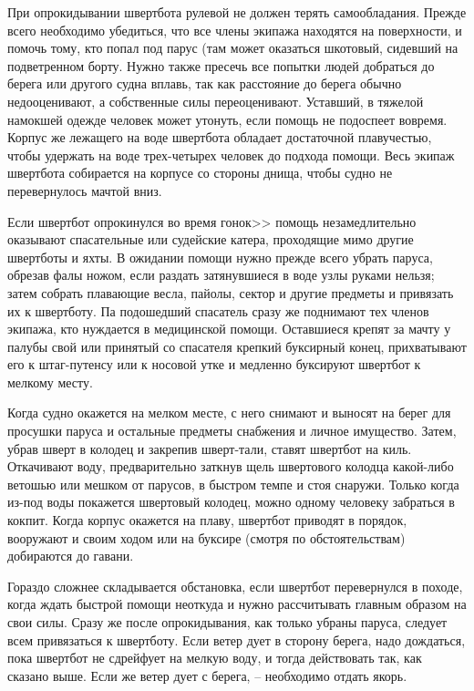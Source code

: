 \documentclass[a4paper, 12pt, twoside, final]{scrbook}
\begin{document}
При опрокидывании швертбота рулевой не должен терять самообладания. Прежде всего необходимо убедиться, что все члены экипажа находятся на поверхности, и помочь тому, кто попал под парус (там может оказаться шкотовый, сидевший на подветренном борту. Нужно также пресечь все попытки людей добраться до берега или другого судна вплавь, так как расстояние до берега обычно недооценивают, а собственные силы переоценивают. Уставший, в тяжелой намокшей одежде человек может утонуть, если помощь не подоспеет вовремя. Корпус же лежащего на воде швертбота обладает достаточной плавучестью, чтобы удержать на воде трех-четырех человек до подхода помощи. Весь экипаж швертбота собирается на корпусе со стороны днища, чтобы судно не перевернулось мачтой вниз.

Если швертбот опрокинулся во время гонок>> помощь незамедлительно оказывают спасательные или судейские катера, проходящие мимо другие швертботы и яхты. В ожидании помощи нужно прежде всего убрать паруса, обрезав фалы ножом, если раздать затянувшиеся в воде узлы руками нельзя; затем собрать плавающие весла, пайолы, сектор и другие предметы и привязать их к швертботу. Па подошедший спасатель сразу же поднимают тех членов экипажа, кто нуждается в медицинской помощи. Оставшиеся крепят за мачту у палубы свой или принятый со спасателя крепкий буксирный конец, прихватывают его к штаг-путенсу или к носовой утке и медленно буксируют швертбот к мелкому месту.

Когда судно окажется на мелком месте, с него снимают и выносят на берег для просушки паруса и остальные предметы снабжения и личное имущество. Затем, убрав шверт в колодец и закрепив шверт-тали, ставят швертбот на киль. Откачивают воду, предварительно заткнув щель швертового колодца какой-либо ветошью или мешком от парусов, в быстром темпе и стоя снаружи. Только когда из-под воды покажется швертовый колодец, можно одному человеку забраться в кокпит. Когда корпус окажется на плаву, швертбот приводят в порядок, вооружают и своим ходом или на буксире (смотря по обстоятельствам) добираются до гавани.

Гораздо сложнее складывается обстановка, если швертбот перевернулся в походе, когда ждать быстрой помощи неоткуда и нужно рассчитывать главным образом на свои силы. Сразу же после опрокидывания, как только убраны паруса, следует всем привязаться к швертботу. Если ветер дует в сторону берега, надо дождаться, пока швертбот не сдрейфует на мелкую воду, и тогда действовать так, как сказано выше. Если же ветер дует с берега, \--- необходимо отдать якорь.
\end{document}
